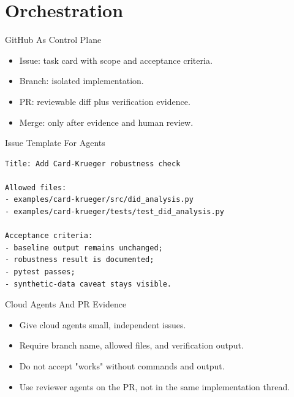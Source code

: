 \section{Orchestration}

\begin{frame}{GitHub As Control Plane}
  \begin{itemize}
    \item Issue: task card with scope and acceptance criteria.
    \item Branch: isolated implementation.
    \item PR: reviewable diff plus verification evidence.
    \item Merge: only after evidence and human review.
  \end{itemize}
\end{frame}

\begin{frame}[fragile]{Issue Template For Agents}
  \begin{lstlisting}[style=markdown]
Title: Add Card-Krueger robustness check

Allowed files:
- examples/card-krueger/src/did_analysis.py
- examples/card-krueger/tests/test_did_analysis.py

Acceptance criteria:
- baseline output remains unchanged;
- robustness result is documented;
- pytest passes;
- synthetic-data caveat stays visible.
  \end{lstlisting}
\end{frame}

\begin{frame}{Cloud Agents And PR Evidence}
  \begin{itemize}
    \item Give cloud agents small, independent issues.
    \item Require branch name, allowed files, and verification output.
    \item Do not accept "works" without commands and output.
    \item Use reviewer agents on the PR, not in the same implementation thread.
  \end{itemize}
\end{frame}

